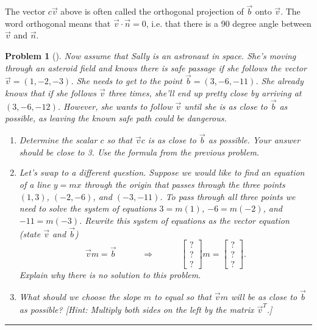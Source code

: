 \documentclass[letterpaper,oneside]{book}%
\theoremstyle{plain}
\theoremstyle{box}
\theoremstyle{problem}
\newtheorem{problemnum}{Problem}[chapter]
\newenvironment{problem}[1][]{\begin{problemnum}[#1]}{\end{problemnum}\nopagebreak\hrule\bigskip}
\newcommand{\bvec}[1]{\begin{bmatrix} #1 \end{bmatrix}}
\begin{document}
The vector $c\vec v$ above is often called the orthogonal projection of $\vec b$ onto $\vec v$. The word orthogonal means that $\vec v\cdot \vec n=0$, i.e. that there is a 90 degree angle between $\vec v$ and $\vec n$. 


\begin{problem}
 Now assume that Sally is an astronaut in space. She's moving through an asteroid field and knows there is safe passage if she follows the vector $\vec v = (1,-2,-3)$. She needs to get to the point $\vec b=(3,-6,-11)$. She already knows that if she follows $\vec v$ three times, she'll end up pretty close by arriving at $(3,-6,-12)$. However, she wants to follow $\vec v$ until she is as close to $\vec b$ as possible, as leaving the known safe path could be dangerous.  
\begin{enumerate}
 \item 
Determine the scalar $c$ so that $\vec v c$ is as close to $\vec b$ as possible. Your answer should be close to 3.  Use the formula from the previous problem.
  \item 
Let's swap to a different question. 
Suppose we would like to find an equation of a line $y=mx$ through the origin that passes through the three points  $(1,3)$, $(-2,-6)$, and $(-3,-11)$.
To pass through all three points we need to solve the system of equations $3=m(1)$, $-6=m(-2)$, and $-11=m(-3)$. 
Rewrite this system of equations as the vector equation (state $\vec v$ and $\vec b$) 
$$\vec v m = \vec b \quad\quad\quad\Rightarrow\quad\quad\quad \bvec{?\\?\\?}m = \bvec{?\\?\\?}.$$
Explain why there is no solution to this problem. 
  \item
What should we choose the slope $m$ to equal so that $\vec v m$ will be as close to $\vec b$ as possible? [Hint: Multiply both sides on the left by the matrix $\vec v^T$.]
 \end{enumerate}
\end{problem}
\end{document}

